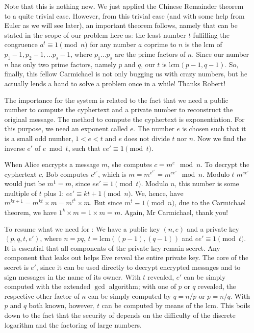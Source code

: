 \documentclass{scrreprt}
\newcommand{\Varid}[1]{\mathit{#1}}
\begin{document}
Note that this is nothing new.
We just applied the Chinese Remainder theorem
to a quite trivial case.
However, from this trivial case
(and with some help from Euler
as we will see later),
an important theorem follows, namely
 that can be stated
in the scope of our problem here as:
the least number $t$ fulfilling the congruence
$a^t \equiv 1 \pmod{n}$
for any number $a$ coprime to $n$
is the $\textrm{lcm}$ of 
$p_1-1, p_2-1, \dots p_s-1$,
where $p_1\dots p_s$ are the prime factors of $n$.
Since our number $n$ has only two prime factors,
namely $p$ and $q$, our $t$ is $\textrm{lcm}(p-1,q-1)$.
So, finally, this fellow Carmichael is not
only bugging us with crazy numbers,
but he actually lends a hand to solve a problem
once in a while!
Thanks Robert!

The importance for the  system
is related to the fact that we need a public number
to compute the cyphertext and a private number
to reconstruct the original message.
The method to compute the cyphertext is exponentiation.
For this purpose, we need an exponent called $e$.
The number $e$ is chosen such that 
it is a small odd number, $1 < e < t$ and
$e$ does not divide $t$ nor $n$.
Now we find the inverse $e'$ of $e \bmod{t}$,
such that $ee' \equiv 1 \pmod{t}$.

When Alice encrypts a message $m$,
she computes $c = m^e \mod{n}$. 
To decrypt the cyphertext $c$, Bob 
computes $c^{e'}$, which is 
$m = m^{e^{e'}} = m^{ee'} \mod{n}$.
Modulo $t$ $m^{ee'}$ would just be $m^1 = m$,
since $ee' \equiv 1 \pmod{t}$.
Modulo $n$, this number is some multiple of $t$
plus 1: $ee' \equiv kt + 1 \pmod{n}$.
We, hence, have 
$m^{kt+1} = m^{kt} \times m = m^{t^k} \times m$.
But since $m^t \equiv 1 \pmod{n}$,
due to the Carmichael theorem, we have
$1^k \times m = 1 \times m = m$.
Again, Mr Carmichael, thank you!

To resume what we need for :
We have a public key \ensuremath{(\Varid{n},\Varid{e})} and
a private key \ensuremath{(\Varid{p},\Varid{q},\Varid{t},\Varid{e'})}, where
$n = pq$, 
$t = \textrm{lcm}((p-1),(q-1))$ and
$ee' \equiv 1 \pmod{t}$.
It is essential that 
all components of the private key
remain secret.
Any component that leaks out
helps Eve reveal the entire private key.
The core of the secret is $e'$,
since it can be used directly to decrypt
encrypted messages and to sign 
messages in the name of its owner.
With $t$ revealed, $e'$ can be simply
computed with the extended $\gcd$ algorithm;
with one of $p$ or $q$ revealed, 
the respective other factor of $n$
can be simply computed by $q = n/p$ or $p = n/q$.
With $p$ and $q$ both known, however,
$t$ can be computed by means of the $\textrm{lcm}$.
This boils down to the fact that the security
of  depends on the difficulty
of the discrete logarithm and the factoring
of large numbers.
\end{document}
